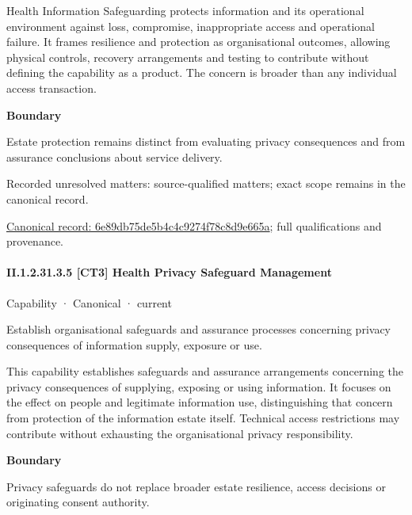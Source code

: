 Health Information Safeguarding protects information and its operational environment against loss, compromise, inappropriate access and operational failure. It frames resilience and protection as organisational outcomes, allowing physical controls, recovery arrangements and testing to contribute without defining the capability as a product. The concern is broader than any individual access transaction.



\textbf{Boundary}



Estate protection remains distinct from evaluating privacy consequences and from assurance conclusions about service delivery.


{\small Recorded unresolved matters: source-qualified matters; exact scope remains in the canonical record.}\par
{\footnotesize \href{../../../../continuum/strategy/capability/6e89db75de5b4c4c9274f78c8d9e665a.md}{Canonical record: 6e89db75de5b4c4c9274f78c8d9e665a}; full qualifications and provenance.}\par
\paragraph*{II.1.2.31.3.5 [CT3] Health Privacy Safeguard Management}
\label{navigation:II.1.2.31.3.5}

\label{element:089cd8744ed6410388daeff463507fc1}
{\small Capability · Canonical · current}\par

Establish organisational safeguards and assurance processes concerning privacy consequences of information supply, exposure or use.



This capability establishes safeguards and assurance arrangements concerning the privacy consequences of supplying, exposing or using information. It focuses on the effect on people and legitimate information use, distinguishing that concern from protection of the information estate itself. Technical access restrictions may contribute without exhausting the organisational privacy responsibility.



\textbf{Boundary}



Privacy safeguards do not replace broader estate resilience, access decisions or originating consent authority.


